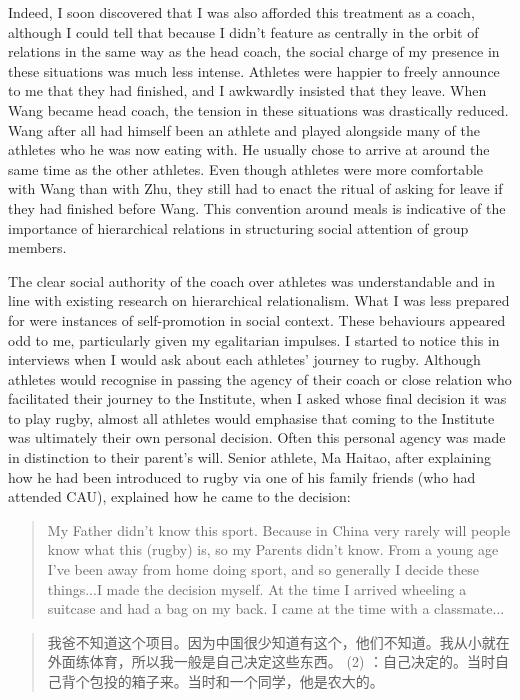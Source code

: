   Indeed, I soon discovered that I was also afforded this treatment as a coach, although I could tell that because I didn't feature as centrally in the orbit of relations in the same way as the head coach, the social charge of my presence in these situations was much less intense.  Athletes were happier to freely announce to me that they had finished, and I awkwardly insisted that they leave.  When Wang became head coach, the tension in these situations was drastically reduced. Wang after all had himself been an athlete and played alongside many of the athletes who he was now eating with.  He usually chose to arrive at around the same time as the other athletes.  Even though athletes were more comfortable with Wang than with Zhu, they still had to enact the ritual of asking for leave if they had finished before Wang.  This convention around meals is indicative of the importance of hierarchical relations in structuring social attention of group members.

  The clear social authority of the coach over athletes was understandable and in line with existing research on hierarchical relationalism.  What I was less prepared for were instances of self-promotion in social context.  These behaviours appeared odd to me, particularly given my egalitarian impulses.  I started to notice this in interviews when I would ask about each athletes' journey to rugby.  Although athletes would recognise in passing the agency of their coach or close relation who facilitated their journey to the Institute, when I asked whose final decision it was to play rugby, almost all athletes would emphasise that coming to the Institute was ultimately their own personal decision.  Often this personal agency was made in distinction to their parent's will.  Senior athlete, Ma Haitao, after explaining how he had been introduced to rugby via one of his family friends (who had attended CAU), explained how he came to the decision:

  \begin{quotation}
    My Father didn't know this sport.  Because in China very rarely will people know what this (rugby) is, so my Parents didn't know. From a young age I've been away from home doing sport, and so generally I decide these things...I made the decision myself.  At the time I arrived wheeling a suitcase and had a bag on my back.  I came at the time with a classmate...
  \end{quotation}

  \begin{CJK}{UTF8}{gbsn}
    \begin{quotation}
      我爸不知道这个项目。因为中国很少知道有这个，他们不知道。我从小就在外面练体育，所以我一般是自己决定这些东西。 (2) ：自己决定的。当时自己背个包投的箱子来。当时和一个同学，他是农大的。
    \end{quotation}
  \end{CJK}

